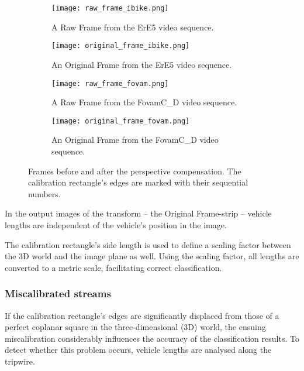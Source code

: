 \begin{figure}[!t]
	\centering
		\begin{subfigure}[b]{0.36\textwidth}
			\texttt{[image: raw\_frame\_ibike.png]}
			\caption{A Raw Frame from the ErE5 video sequence.}
		\end{subfigure}
		\quad
		\begin{subfigure}[b]{0.36\textwidth}
			\texttt{[image: original\_frame\_ibike.png]}
			\caption{An Original Frame from the ErE5 video sequence.}
		\end{subfigure}
		\hfill
		\begin{subfigure}[b]{0.36\textwidth}
			\texttt{[image: raw\_frame\_fovam.png]}
			\caption{A Raw Frame from the FovamC\_D video sequence.}
		\end{subfigure}
		\quad
		\begin{subfigure}[b]{0.36\textwidth}
			\texttt{[image: original\_frame\_fovam.png]}
			\caption{An Original Frame from the FovamC\_D video sequence.}
		\end{subfigure}
		
		\caption[The effect of perspective compensation on frames]{Frames before and after the perspective compensation. The calibration rectangle's edges are marked with their sequential numbers.\label{fig:perscomp}}
\end{figure}

In the output images of the transform -- the Original Frame-strip --  vehicle lengths are independent of the vehicle's position in the image. 

The calibration rectangle's side length is used to define a scaling factor between the 3D world and the image plane as well.
Using the scaling factor, all lengths are converted to a metric scale, facilitating correct classification.

\subsubsection{Miscalibrated streams}
If the calibration rectangle's edges are significantly displaced from those of a perfect coplanar square in the three-dimensional (3D) world, the ensuing miscalibration considerably influences the accuracy of the classification results.
To detect whether this problem occurs, vehicle lengths are analysed along the tripwire.

